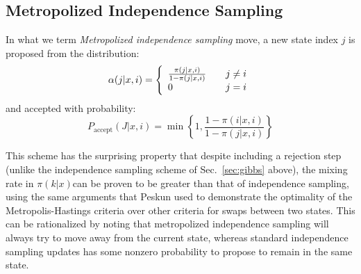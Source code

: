 \documentclass[superscriptaddress,showkeys, nofootinbib, pre, aps]{revtex4-1}
\begin{document}
\subsection{Metropolized Independence Sampling}
In what we term \emph{Metropolized independence sampling} move, \cite{liu:biometrika:1996:metropolized-gibbs} a new state index $j$ is proposed from the distribution:
\begin{equation}\label{eq:metgibbsproposal}
  \alpha(j| x, i) = \left\{
  \begin{array}{l l}
    \frac{\pi(j|x, i)}{1-\pi(j|x, i)} & \quad j \neq i\\
    0 & \quad j = i
  \end{array} \right.
\end{equation}
and accepted with probability:
\begin{equation}\label{eq:metgibbsaccept}
  P_{\text{accept}}(J|x, i)= \min\left\{1, \frac{1-\pi(i|x, i)}{1-\pi(j|x, i)}\right\}
\end{equation}

This scheme has the surprising property that despite including a rejection step (unlike the independence sampling scheme of Sec.~\ref{sec:gibbs} above), the mixing rate in $\pi(k|x)$can be proven to be greater than that of independence sampling, \cite{liu:biometrika:1996:metropolized-gibbs}using the same arguments that Peskun used to demonstrate the optimality of the Metropolis-Hastings criteria over other criteria for swaps between two states.  This can be rationalized by noting that metropolized independence sampling will always try to move away from the current state, whereas standard independence sampling updates has some nonzero probability to propose to remain in the same state.


\end{document}

